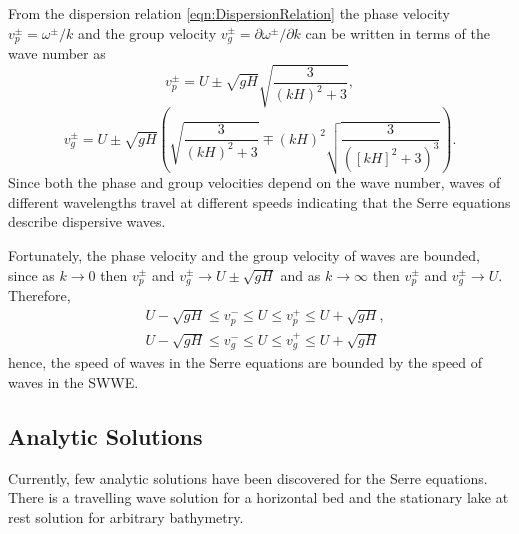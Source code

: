 From the dispersion relation \eqref{eqn:DispersionRelation} the phase velocity $v_p^\pm = \omega^\pm / k$ and the group velocity $v_g^\pm = \partial \omega^\pm / \partial  k$ can be written in terms of the wave number as
	\begin{equation*}
	\label{eqn:WaveVelocitiesPhase}
	v_p^\pm = U \pm \sqrt{gH}\sqrt{\frac{3}{\left(kH\right)^2 + 3}},
	\end{equation*}
	\begin{equation*}
	\label{eqn:WaveVelocitiesGroup}
	v_g^\pm = U \pm \sqrt{gH} \left(\sqrt{\frac{3}{\left(kH\right)^2 + 3}} \mp \left(kH\right)^2 \sqrt{\frac{3}{\left(\left[kH\right]^2 + 3 \right)^3}}\right).
	\end{equation*}
Since both the phase and group velocities depend on the wave number, waves of different wavelengths travel at different speeds indicating that the Serre equations describe dispersive waves.

Fortunately, the phase velocity and the group velocity of waves are bounded, since as $k \rightarrow 0$ then $v_p^\pm$ and $v_g^\pm \rightarrow U \pm \sqrt{gH}$ and as $k \rightarrow \infty$ then $v_p^\pm$ and $v_g^\pm \rightarrow U$. Therefore,
\begin{subequations}
\begin{align}
&U - \sqrt{gH} \le v_p^- \le U \le v_p^+ \le U + \sqrt{gH}, \\
&U - \sqrt{gH} \le v_g^- \le U \le v_g^+ \le U + \sqrt{gH}
\end{align}
\label{eqn:WaveVelocitiesBound}
\end{subequations}
hence, the speed of waves in the Serre equations are bounded by the speed of waves in the SWWE.

\subsection{Analytic Solutions}
Currently, few analytic solutions have been discovered for the Serre equations. There is a travelling wave solution for a horizontal bed \cite{El-etal-2006} and the stationary lake at rest solution for arbitrary bathymetry.


